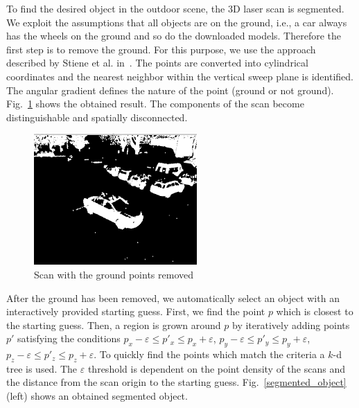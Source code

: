 \documentclass{llncs}
\renewcommand{\epsilon}{\varepsilon}
\begin{document}
To find the desired object in the outdoor scene, the 3D laser scan is
segmented. We exploit the assumptions that all objects are on the
ground, i.e., a car always has the wheels on the ground and so do the
downloaded models. Therefore the first step is to remove the
ground. For this purpose, we use the approach described by Stiene et
al. in~\cite{Stiene:2006}. The points are converted into cylindrical
coordinates and the nearest neighbor within the vertical sweep plane
is identified. The angular gradient defines the nature of the point
(ground or not ground). Fig.~\ref{groundremoved} shows the obtained
result. The components of the scan become distinguishable and
spatially disconnected.
  
  \begin{figure}
\centering
      \includegraphics[height=50mm]{ground-removed}
    \caption{Scan with the ground points removed}
    \label{groundremoved}
  \end{figure}

After the ground has been removed, we automatically select an object
with an interactively provided starting guess. First, we find the
point $p$ which is closest to the starting guess. Then, a region is
grown around $p$ by iteratively adding points $p'$ satisfying the
conditions $p_x - \epsilon \leq p'_x \leq p_x + \epsilon$, $p_y -
\epsilon \leq p'_y \leq p_y + \epsilon$, $p_z - \epsilon \leq p'_z
\leq p_z + \epsilon$. To quickly find the points which match the
criteria a $k$-d tree is used. The $\epsilon$ threshold is dependent
on the point density of the scans and the distance from the scan
origin to the starting guess. Fig.~\ref{segmented_object} (left)
shows an obtained segmented object.
	
\end{document}
